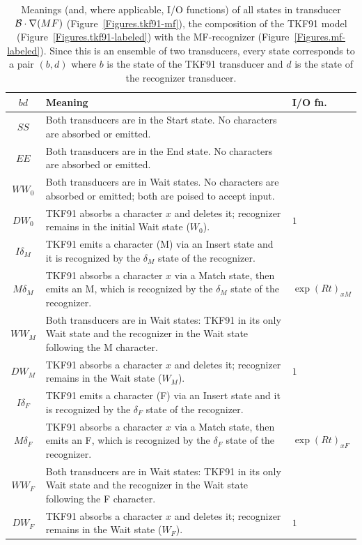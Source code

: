 \documentclass{article}
\newcommand{\tablabel}[1]{\label{tab.#1}}
\newcommand{\figref}[1]{Figure~\ref{Figures.#1}}
\newcommand\tkf{{\cal B}}
\newcommand\recognize{\nabla}
\begin{document}
\begin{table}
\begin{tabular}{c|p{}|p{}}
$b d$ & Meaning & I/O fn. \\
\hline
$SS$ & Both transducers are in the Start state.  No characters are  absorbed or emitted. &  \\
$EE$ & Both transducers are in the End state.  No characters are  absorbed or emitted. &  \\
$WW_0$ & Both transducers are in Wait states.  No characters are absorbed or emitted; both are poised to accept input.  &  \\
$DW_0$ & TKF91 absorbs a character $x$ and deletes it; recognizer remains in the initial Wait state ($W_0$).   & $1$ \\
$I\delta_M$ & TKF91 emits a character (M) via an Insert state and it is recognized by the $\delta_M$ state of the recognizer.   &  \\
$M\delta_M$ & TKF91 absorbs a character $x$ via a Match state, then emits an M, which is recognized by the $\delta_M$ state of the recognizer.   & $\exp(Rt)_{xM}$ \\
$WW_M$ & Both transducers are in Wait states: TKF91 in its only Wait state and the recognizer in the Wait state following the M character.  &  \\
$DW_M$ & TKF91 absorbs a character $x$ and deletes it; recognizer remains in the Wait state ($W_M$).   & $1$ \\
$I\delta_F$ & TKF91 emits a character (F) via an Insert state and it is recognized by the $\delta_F$ state of the recognizer.   &  \\
$M\delta_F$ & TKF91 absorbs a character $x$ via a Match state, then emits an F, which is recognized by the $\delta_F$ state of the recognizer.   & $\exp(Rt)_{xF}$ \\
$WW_F$ & Both transducers are in Wait states: TKF91 in its only Wait state and the recognizer in the Wait state following the F character.  &  \\
$DW_F$ & TKF91 absorbs a character $x$ and deletes it; recognizer remains in the Wait state ($W_F$).   & $1$ \\
\end{tabular}
\caption{ \tablabel{tkf91-mf} Meanings (and, where applicable, I/O functions) of all states in
transducer $\tkf \cdot \recognize(MF)$ (\figref{tkf91-mf}),
the composition of the TKF91 model (\figref{tkf91-labeled}) with the MF-recognizer (\figref{mf-labeled}).
Since this is an ensemble of two transducers, every state corresponds to a pair $(b,d)$
where
$b$ is the state of the TKF91 transducer and
$d$ is the state of the recognizer transducer.
 }
\end{table}
\end{document}
